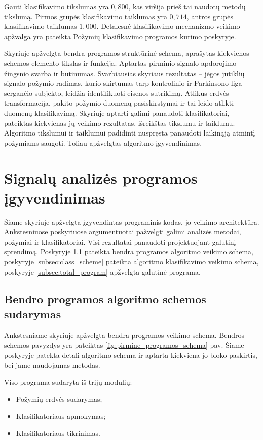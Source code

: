 \documentclass[]{vgtuef}
\begin{document}
Gauti klasifikavimo tikslumas yra $0,800$, kas viršija prieš tai naudotų metodų tikslumą. Pirmos grupės klasifikavimo taiklumas yra $0,714$, antros grupės klasifikavimo taiklumas $1,000$. Detalesnė klasifikavimo mechanizmo veikimo apžvalga yra pateikta Požymių klasifikavimo programos kūrimo poskyryje.

Skyriuje apžvelgta bendra programos struktūrinė schema, aprašytas kiekvienos schemos elemento tikslas ir funkcija. Aptartas pirminio signalo apdorojimo žingsnio svarba ir būtinumas. Svarbiausias skyriaus rezultatas -- jėgos jutiklių signalo požymio radimas, kurio skirtumas tarp kontrolinio ir Parkinsono liga sergančio subjekto, leidžia identifikuoti eisenos sutrikimą. Atlikus erdvės transformacija, pakito požymio duomenų pasiskirstymai ir tai leido atlikti duomenų klasifikavimą. Skyriuje aptarti galimi panaudoti klasifikatoriai, pateiktas kiekvienas jų veikimo rezultatas, išreikštas tikslumu ir taiklumu. Algoritmo tikslumui ir taiklumui padidinti nuspręsta panaudoti laikinąją atmintį požymiams saugoti. Toliau apžvelgtas algoritmo įgyvendinimas.

\section{Signalų analizės programos įgyvendinimas}

Šiame skyriuje apžvelgta įgyvendintas programinis kodas, jo veikimo architektūra. Ankstesniuose poskyriuose argumentuotai pažvelgti galimi analizės metodai, požymiai ir klasifikatoriai. Visi rezultatai panaudoti projektuojant galutinį sprendimą. Poskyryje \ref{subsec:total_scheme} pateikta bendra programos algoritmo veikimo schema, poskyryje \ref{subsec:class_scheme} pateikta algoritmo klasifikavimo veikimo schema, poskyryje \ref{subsec:total_program} apžvelgta galutinė programa.

\subsection{Bendro programos algoritmo schemos sudarymas}
\label{subsec:total_scheme}

Ankstesniame skyriuje apžvelgta bendra programos veikimo schema. Bendros schemos pavyzdys yra pateiktas \ref{fig:pirmine_programos_schema} pav. Šiame poskyryje patekta detali algoritmo schema ir aptarta kiekviena jo bloko paskirtis, bei jame naudojamas metodas.

Viso programa sudaryta iš trijų modulių:

\begin{itemize}
\item Požymių erdvės sudarymas;
\item Klasifikatoriaus apmokymas;
\item Klasifikatoriaus tikrinimas.
\end{itemize}
\end{document}
